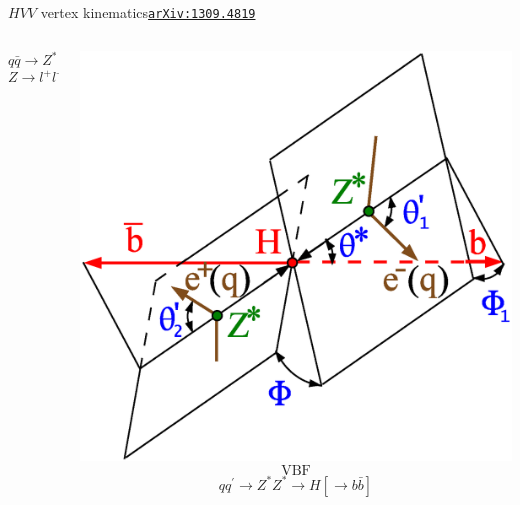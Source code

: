 \documentclass[usenames,dvipsnames,svgnames,table]{beamer}
\newcommand{\arxiv}[1]{\href{http://arxiv.org/abs/#1}{\nolinkurl{arXiv:#1}}}
\newcommand{\snowmass}{\arxiv{1309.4819}}
\begin{document}
\begin{frame}{$HVV$ vertex kinematics}{\snowmass}
\begin{columns}
\begin{column}{0.33\textwidth}
\[q\bar{q}\to Z^*\to ZH\]
\[Z\to l^+l^- \left[H\to b\bar{b}\right]\]
\end{column}
\begin{column}{0.33\textwidth} \centering
\includegraphics[width=\columnwidth]{snowmass/angles-HZZVBF} \\
\[\text{VBF}\]
\[qq^\prime\to Z^*Z^*\to H\left[\to b\bar{b}\right]\]
\end{column}
\end{columns}
\vfill
\end{frame}
\end{document}
